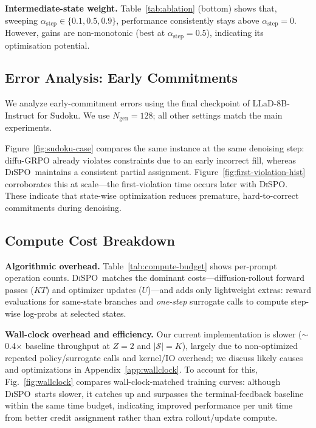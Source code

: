 \documentclass{article}
\newcommand{\method}{{\textsc{DiSPO}}}
\theoremstyle{plain}
\theoremstyle{definition}
\theoremstyle{remark}
\begin{document}
\textbf{Intermediate-state weight.}
Table~\ref{tab:ablation} (bottom) shows that, 
sweeping $\alpha_{\text{step}}\!\in\!\{0.1,0.5,0.9\}$, performance consistently stays above $\alpha_{\text{step}}{=}0$. 
However, gains are non-monotonic (best at $\alpha_{\text{step}}{=}0.5$), indicating its optimisation potential.




\subsection{Error Analysis: Early Commitments}
\label{sec:qual}
We analyze early-commitment errors using the final checkpoint of LLaD-8B-Instruct for Sudoku. We use $N_{\text{gen}}{=}128$; all other settings match the main experiments.

Figure~\ref{fig:sudoku-case} compares the same instance at the same denoising step: diffu-GRPO already violates constraints due to an early incorrect fill, whereas \method\ maintains a consistent partial assignment.
Figure~\ref{fig:first-violation-hist} corroborates this at scale---the first-violation time occurs later with \method.
These indicate that state-wise optimization reduces premature, hard-to-correct commitments during denoising.



\subsection{Compute Cost Breakdown}
\label{sec:exp:compute}

\textbf{Algorithmic overhead.}
Table~\ref{tab:compute-budget} shows per-prompt operation counts.
\method\ matches the dominant costs---diffusion-rollout forward passes ($KT$) and optimizer updates ($U$)---and adds only lightweight extras: reward evaluations for same-state branches and \emph{one-step} surrogate calls to compute step-wise log-probs at selected states.

\textbf{Wall-clock overhead and efficiency.}
Our current implementation is slower ($\sim$0.4$\times$ baseline throughput at $Z{=}2$ and $|\mathcal{S}|{=}K$), largely due to non-optimized repeated policy/surrogate calls and kernel/IO overhead; we discuss likely causes and optimizations in Appendix~\ref{app:wallclock}.
To account for this, Fig.~\ref{fig:wallclock} compares wall-clock-matched training curves: although \method\ starts slower, it catches up and surpasses the terminal-feedback baseline within the same time budget, indicating improved performance per unit time from better credit assignment rather than extra rollout/update compute.
\end{document}
